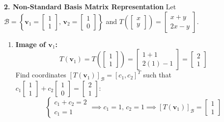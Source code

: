 \textbf{2. Non-Standard Basis Matrix Representation}
Let $\mathcal{B} = \left\{ \mathbf{v}_1 = \begin{bmatrix} 1 \\ 1 \end{bmatrix}, \, \mathbf{v}_2 = \begin{bmatrix} 1 \\ 0 \end{bmatrix} \right\}$ and $T\left(\begin{bmatrix} x \\ y \end{bmatrix}\right) = \begin{bmatrix} x + y \\ 2x - y \end{bmatrix}$.
\begin{enumerate}
    \item \textbf{Image of $\mathbf{v}_1$:}
    \begin{equation*}
    T(\mathbf{v}_1) = T\left(\begin{bmatrix} 1 \\ 1 \end{bmatrix}\right) = \begin{bmatrix} 1 + 1 \\ 2(1) - 1 \end{bmatrix} = \begin{bmatrix} 2 \\ 1 \end{bmatrix}
    \end{equation*}
    Find coordinates $[T(\mathbf{v}_1)]_\mathcal{B} = [c_1, c_2]^T$ such that $c_1 \begin{bmatrix} 1 \\ 1 \end{bmatrix} + c_2 \begin{bmatrix} 1 \\ 0 \end{bmatrix} = \begin{bmatrix} 2 \\ 1 \end{bmatrix}$:
    \begin{equation*}
    \begin{cases} c_1 + c_2 = 2 \\ c_1 = 1 \end{cases} \implies c_1 = 1, \, c_2 = 1 \implies [T(\mathbf{v}_1)]_{\mathcal{B}} = \begin{bmatrix} 1 \\ 1 \end{bmatrix}

\end{equation*}
\end{enumerate}
